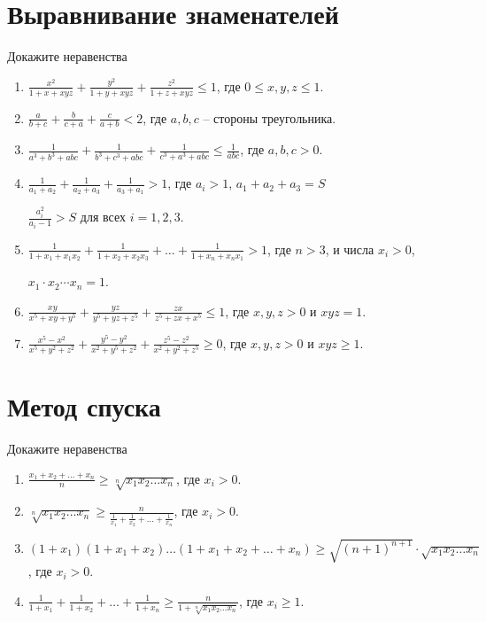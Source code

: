 \documentclass[a4paper,12pt,leqno]{article}
\begin{document}
	\section*{Выравнивание знаменателей}
	Докажите неравенства
	\begin{enumerate}
		\item[\z] $\displaystyle\frac{x^2}{1+x+xyz} + \frac{y^2}{1 + y + xyz} + \frac{z^2}{1 + z + xyz} \leqslant 1$, где $0 \leqslant x, y, z \leqslant 1$.
		\item[\z] $\displaystyle\frac{a}{b+c} + \frac{b}{c+a} + \frac{c}{a+b} < 2$, где $a, b, c$ -- стороны треугольника.
		\item[\hw] $\displaystyle\frac{1}{a^3+b^3+abc} + \frac{1}{b^3 + c^3 + abc} + \frac{1}{c^3 + a^3 + abc} \leqslant \frac{1}{abc}$, где $a, b, c > 0$. 
		\item[\hw] $\displaystyle\frac{1}{a_1+a_2} + \frac{1}{a_2+a_3} + \frac{1}{a_3+a_1} > 1$, где $a_i > 1$, $a_1+a_2+a_3 = S$ 
		
		$\displaystyle\frac{a_i^2}{a_i-1} > S$ для всех $i=1, 2, 3.$
		\item[\hw] $\displaystyle\frac{1}{1+x_1+x_1x_2} + \frac{1}{1+x_2 + x_2x_3} + \dots + \frac{1}{1+x_n + x_nx_1} > 1$, где $n > 3$, и числа $x_i > 0$, 
		
		$x_1 \cdot x_2  \cdots x_n = 1$.

		\item[\hw] $\displaystyle\frac{xy}{x^5 + xy + y^5} + \frac{yz}{y^5 + yz + z^5} + \frac{zx}{z^5 + zx + x^5} \leqslant 1$, где $x, y, z > 0$ и $xyz=1$.
		\item[\hw] $\displaystyle\frac{x^5-x^2}{x^5+y^2+z^2} + \frac{y^5-y^2}{x^2+y^5+z^2} + \frac{z^5-z^2}{x^2+y^2+z^5} \geqslant 0$, где $x, y, z > 0$ и $xyz \geqslant 1$.
	\end{enumerate}

	\section*{Метод спуска}
	Докажите неравенства
	\begin{enumerate}
		\item[\hw] $\displaystyle\frac{x_1+x_2+\dots+x_n}{n} \geqslant \sqrt[n]{x_1x_2\dots x_n}$, где $x_i > 0$.
		\item[\hw] $\displaystyle\sqrt[n]{x_1x_2\dots x_n} \geqslant \frac{n}{\frac{1}{x_1} + \frac{1}{x_2} + \dots + \frac{1}{x_n}}$, где $x_i > 0$.
		\item[\hw] $(1+x_1)(1+x_1+x_2)\dots (1+x_1+x_2+\dots +x_n) \geqslant \sqrt{(n+1)^{n+1}}\cdot \sqrt{x_1x_2\dots x_n}$, где $x_i > 0$.
		\item[\hw] $\displaystyle\frac{1}{1+x_1} + \frac{1}{1+x_2} + \dots + \frac{1}{1+x_n}\geqslant \frac{n}{1+\sqrt[n]{x_1x_2\dots x_n}}$, где $x_i \geqslant 1$. 
	\end{enumerate}
\end{document}
